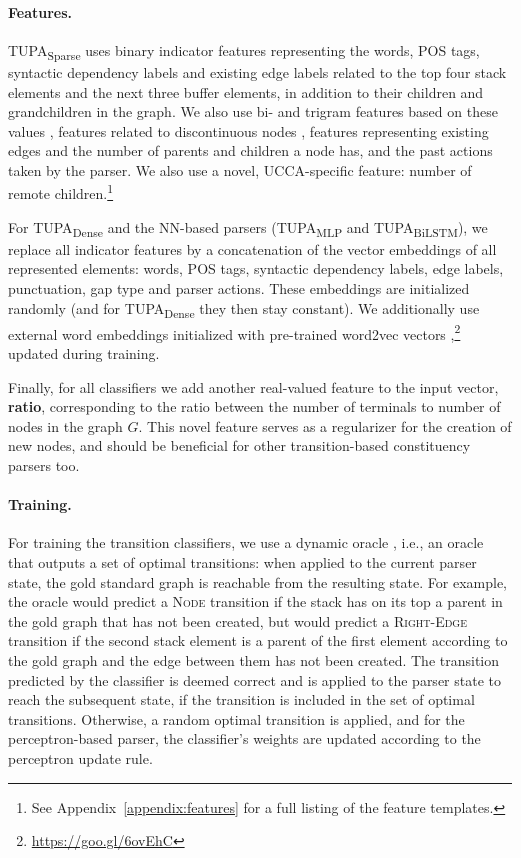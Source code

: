 \documentclass[11pt,a4paper]{article}
\newcommand{\parser}[1]{TUPA\textsubscript{#1}}
\begin{document}
\paragraph{Features.}
\parser{Sparse} uses binary indicator features representing
the words, POS tags, syntactic dependency labels and
existing edge labels related to the top four stack elements and the 
next three buffer elements, in addition to their children and grandchildren in the graph.
We also use bi- and trigram features based on these values \cite{zhang2009transition,zhu2013fast},
features related to discontinuous nodes
\cite[including separating punctuation and gap type]{maier2015discontinuous},
features representing existing edges and the number of parents and children a node has,
and the past actions taken by the parser.
We also use a novel, UCCA-specific feature:
number of remote children.\footnote{See
Appendix~\ref{appendix:features} for a full listing of the feature templates.}

For \parser{Dense} and the NN-based parsers (\parser{MLP} and \parser{BiLSTM}),
we replace all indicator features by a
concatenation of the vector embeddings of all represented elements:
words, POS tags, syntactic dependency labels, edge labels, punctuation, gap type and parser actions.
These embeddings are initialized randomly (and for \parser{Dense} they then stay constant).
We additionally use external word embeddings initialized with
pre-trained word2vec vectors \cite{mikolov2013efficient},\footnote{\url{
https://goo.gl/6ovEhC}} updated during training.

Finally, for all classifiers we add another real-valued feature to the input vector,
\textbf{ratio}, corresponding to the ratio between the number of terminals to number of nodes
in the graph $G$.
This novel feature serves as a regularizer for the creation of new nodes,
and should be beneficial for other transition-based constituency parsers too.

\paragraph{Training.}
For training the transition classifiers, we use a dynamic oracle \cite{goldberg2012dynamic},
i.e., an oracle that outputs a set of optimal transitions: when
applied to the current parser state, the gold
standard graph is reachable from the resulting state.
For example, the oracle would predict a \textsc{Node} transition if the stack 
has on its top a parent in the gold graph that has not been created,
but would predict a \textsc{Right-Edge} transition if the second stack
element is a parent of the
first element according to the gold graph and the edge between them has not been created.
The transition predicted by the classifier is deemed correct
and is applied to the parser state to reach the subsequent state,
if the transition is included in the set of optimal transitions.
Otherwise, a random optimal transition is applied,
and for the perceptron-based parser, the classifier's weights are updated according
to the perceptron update rule.
\end{document}
